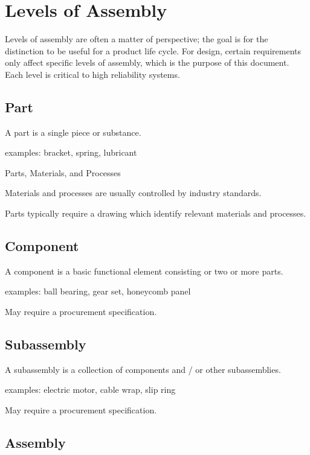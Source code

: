 \documentclass[12pt]{article}
\begin{document}
\newpage

\section{Levels of Assembly}

Levels of assembly are often a matter of perspective; the goal is for the distinction to be useful for a product life cycle.
For design, certain requirements only affect specific levels of assembly, which is the purpose of this document.
Each level is critical to high reliability systems.

\subsection{Part}

A part is a single piece or substance.

examples: bracket, spring, lubricant

Parts, Materials, and Processes

Materials and processes are usually controlled by industry standards.

Parts typically require a drawing which identify relevant materials and processes.

\subsection{Component}

A component is a basic functional element consisting or two or more parts.

examples: ball bearing, gear set, honeycomb panel

May require a procurement specification.

\subsection{Subassembly}

A subassembly is a collection of components and / or other subassemblies.

examples: electric motor, cable wrap, slip ring

May require a procurement specification.

\subsection{Assembly}
\end{document}
